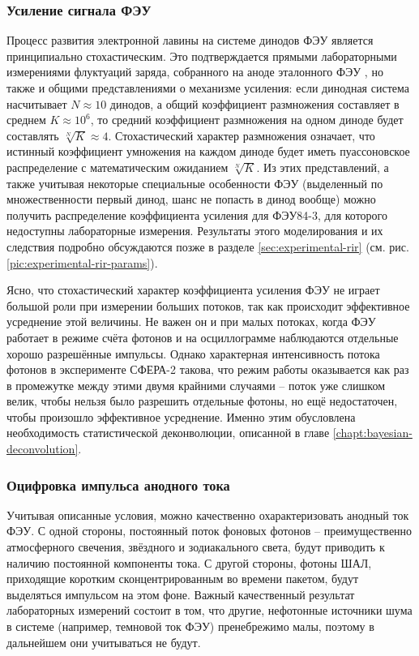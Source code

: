\subsubsection{Усиление сигнала ФЭУ}
\label{sec:pmt-amplification-description}

Процесс развития электронной лавины на системе динодов ФЭУ является принципиально стохастическим. Это подтверждается прямыми лабораторными измерениями флуктуаций заряда, собранного на аноде эталонного ФЭУ \cite[рис. 9]{SphereCalibration2016}, но также и общими представлениями о механизме усиления: если динодная система насчитывает $N \approx 10$ динодов, а общий коэффициент размножения составляет в среднем $K \approx 10^6$, то средний коэффициент размножения на одном диноде будет составлять $\sqrt[N]{K} \approx 4$. Стохастический характер размножения означает, что истинный коэффициент умножения на каждом диноде будет иметь пуассоновское распределение с математическим ожиданием $\sqrt[N]{K}$. Из этих представлений, а также учитывая некоторые специальные особенности ФЭУ (выделенный по множественности первый динод, шанс не попасть в динод вообще) можно получить распределение коэффициента усиления для ФЭУ84-3, для которого недоступны лабораторные измерения. Результаты этого моделирования и их следствия подробно обсуждаются позже в разделе \ref{sec:experimental-rir} (см. рис. \ref{pic:experimental-rir-params}).

Ясно, что стохастический характер коэффициента усиления ФЭУ не играет большой роли при измерении больших потоков, так как происходит эффективное усреднение этой величины. Не важен он и при малых потоках, когда ФЭУ работает в режиме счёта фотонов и на осциллограмме наблюдаются отдельные хорошо разрешённые импульсы. Однако характерная интенсивность потока фотонов в эксперименте СФЕРА-2 такова, что режим работы оказывается как раз в промежутке между этими двумя крайними случаями -- поток уже слишком велик, чтобы нельзя было разрешить отдельные фотоны, но ещё недостаточен, чтобы произошло эффективное усреднение. Именно этим обусловлена необходимость статистической деконволюции, описанной в главе \ref{chapt:bayesian-deconvolution}.

\subsubsection{Оцифровка импульса анодного тока}

Учитывая описанные условия, можно качественно охарактеризовать анодный ток ФЭУ. С одной стороны, постоянный поток фоновых фотонов -- преимущественно атмосферного свечения, звёздного и зодиакального света, будут приводить к наличию постоянной компоненты тока. С другой стороны, фотоны ШАЛ, приходящие коротким сконцентрированным во времени пакетом, будут выделяться импульсом на этом фоне. Важный качественный результат лабораторных измерений состоит в том, что другие, нефотонные источники шума в системе (например, темновой ток ФЭУ) пренебрежимо малы, поэтому в дальнейшем они учитываться не будут.

